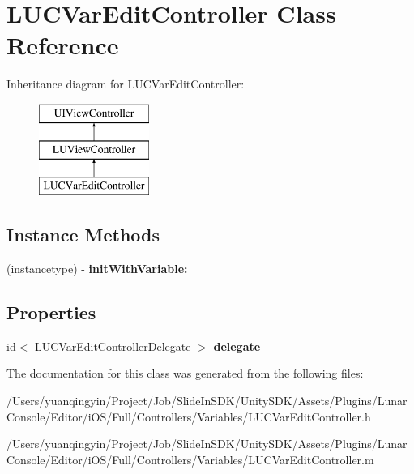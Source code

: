 \hypertarget{interface_l_u_c_var_edit_controller}{}\section{L\+U\+C\+Var\+Edit\+Controller Class Reference}
\label{interface_l_u_c_var_edit_controller}
Inheritance diagram for L\+U\+C\+Var\+Edit\+Controller\+:\begin{figure}[H]
\begin{center}
\leavevmode
\includegraphics[height=3.000000cm]{interface_l_u_c_var_edit_controller}
\end{center}
\end{figure}
\subsection*{Instance Methods}
\begin{DoxyCompactItemize}
\item 
\mbox{\label{interface_l_u_c_var_edit_controller_ad92e6ee472ffb5b75381f2f8275bc5cf}} 
(instancetype) -\/ {\bfseries init\+With\+Variable\+:}
\end{DoxyCompactItemize}
\subsection*{Properties}
\begin{DoxyCompactItemize}
\item 
\mbox{\label{interface_l_u_c_var_edit_controller_ae9b3fc30d189f2a8d78f63abb2d668a7}} 
id$<$ L\+U\+C\+Var\+Edit\+Controller\+Delegate $>$ {\bfseries delegate}
\end{DoxyCompactItemize}


The documentation for this class was generated from the following files\+:\begin{DoxyCompactItemize}
\item 
/\+Users/yuanqingyin/\+Project/\+Job/\+Slide\+In\+S\+D\+K/\+Unity\+S\+D\+K/\+Assets/\+Plugins/\+Lunar\+Console/\+Editor/i\+O\+S/\+Full/\+Controllers/\+Variables/L\+U\+C\+Var\+Edit\+Controller.\+h\item 
/\+Users/yuanqingyin/\+Project/\+Job/\+Slide\+In\+S\+D\+K/\+Unity\+S\+D\+K/\+Assets/\+Plugins/\+Lunar\+Console/\+Editor/i\+O\+S/\+Full/\+Controllers/\+Variables/L\+U\+C\+Var\+Edit\+Controller.\+m\end{DoxyCompactItemize}
